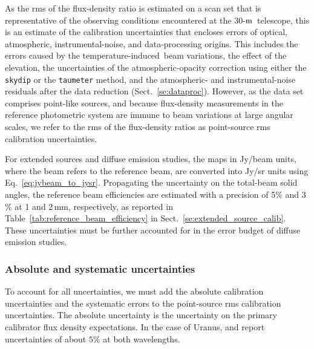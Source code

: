 \documentclass[traditionalabstract]{aa}
\newcommand{\afternoon}{temperature-induced}
\newcommand{\trentemetre}{30-$\rm{m}$}
\newcommand{\lp}[1]{#1}
\newcommand{\rev}[1]{#1}
\begin{document}
{{\lp As the rms of the flux-density ratio is estimated on a scan set
that is representative of the observing conditions encountered at
the \trentemetre\ telescope, this is an estimate of the
calibration uncertainties that encloses errors of
optical, atmospheric, instrumental-noise, and data-processing
origins. This includes the errors caused by the \afternoon\ beam 
variations, the effect of the elevation, the uncertainties of the
atmospheric-opacity correction using either the {\tt skydip} or
the {\tt taumeter} method, and the atmospheric- and instrumental-noise
residuals after the data reduction (Sect.~\ref{se:dataproc}). {\rev
However, as the data set comprises point-like sources, and because flux-density measurements in the reference photometric system are immune to
beam variations at large angular scales, we refer to the rms of the
flux-density ratios as point-source rms calibration uncertainties.}

{\rev For extended sources and diffuse emission studies, the maps in
Jy/beam units, where the beam refers to the reference beam, are
converted into Jy/sr units using
Eq.~\ref{eq:jybeam_to_jysr}. Propagating the uncertainty on the
total-beam solid angles, the reference beam efficiencies are estimated
with a precision of 5$\%$ and 3$\%$ at 1 and 2\,mm,
respectively, as reported in Table~\ref{tab:reference_beam_efficiency}
in Sect.~\ref{se:extended_source_calib}. These uncertainties must be
further accounted for in the error budget of diffuse emission studies.}


\subsubsection{Absolute and systematic uncertainties}
\label{se:def_systematic_errors}

To account for all uncertainties, we must add the absolute calibration
uncertainties and the systematic errors to the {\rev
point-source} rms calibration uncertainties. The absolute uncertainty is
the uncertainty on the primary calibrator flux density expectations. 
In the case of Uranus, \citet{Morenothesis} and \citet{Bendo2013} report 
uncertainties of about $5\%$ at both wavelengths.

}}
\end{document}
